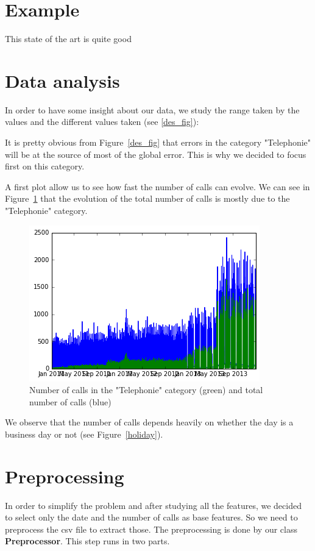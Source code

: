 \section{Example}

This state of the art is quite good~\cite{gama2014survey}

\section{Data analysis}

In order to have some insight about our data, we study the range taken by the values and the different values taken (see \ref{des_fig}):

It is pretty obvious from Figure~\ref{des_fig} that errors in the category "Telephonie" will be at the source of most of the global error. This is why we decided to focus first on this category.

A first plot allow us to see how fast the number of calls can evolve. We can see in Figure~\ref{telephonie_total} that the evolution of the total number of calls is mostly due to the "Telephonie" category.

\begin{figure}[H]
\center
\includegraphics[scale=0.7]{img/telephonie_total.png}
\caption{Number of calls in the "Telephonie" category (green) and total number of calls (blue)}
\label{telephonie_total}
\end{figure}

We observe that the number of calls depends heavily on whether the day is a business day or not (see Figure~\ref{holiday}).

\section{Preprocessing}

In order to simplify the problem and after studying all the features, we decided to select only the date and the number of calls as base features.
So we need to preprocess the csv file to extract those. The preprocessing is done by our class \textbf{Preprocessor}. This step runs in two parts.

